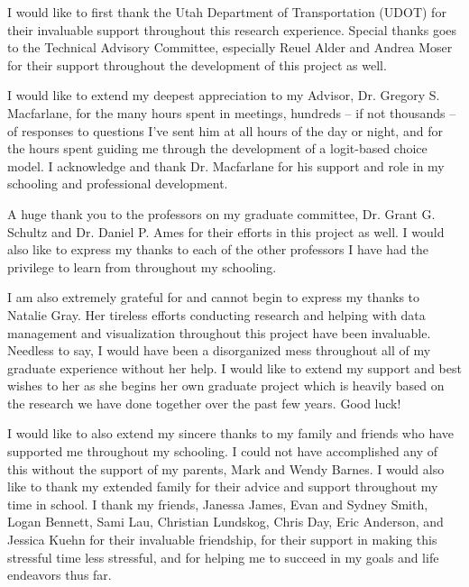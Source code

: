 \afterpage{\cleardoublepage}
%
 I would like to first thank the Utah Department of Transportation (UDOT) for
 their invaluable support throughout this research experience. Special thanks
 goes to the Technical Advisory Committee, especially Reuel Alder and Andrea
 Moser for their support throughout the development of this project as well.

 I would like to extend my deepest appreciation to my Advisor, Dr. Gregory
 S. Macfarlane, for the many hours spent in meetings, hundreds -- if not thousands
 -- of responses to questions I've sent him at all hours of the day or night, and
 for the hours spent guiding me through the development of a logit-based choice
 model. I acknowledge and thank Dr. Macfarlane for his support and role in my
 schooling and professional development.

A huge thank you to the professors on my graduate committee, Dr. Grant G.
Schultz and Dr. Daniel P. Ames for their efforts in this project as well. I
would also like to express my thanks to each of the other professors I have
had the privilege to learn from throughout my schooling.

 I am also extremely grateful for and cannot begin to express my thanks to
 Natalie Gray. Her tireless efforts conducting research and helping with
 data management and visualization throughout this project have been invaluable. Needless to say,
 I would have been a disorganized mess throughout all of my graduate experience
 without her help. I would like to extend my support and best wishes to her as
 she begins her own graduate project which is heavily based on the research we have done
 together over the past few years. Good luck!

I would like to also extend my sincere thanks to my family and friends who have
supported me throughout my schooling. I could not have accomplished any of this
without the support of my parents, Mark and Wendy Barnes. I would also like to
thank my extended family for their advice and support throughout my time in
school. I thank my friends, Janessa James, Evan and Sydney Smith, Logan Bennett,
Sami Lau, Christian Lundskog, Chris Day, Eric Anderson, and Jessica Kuehn for
their invaluable friendship, for their support in making this stressful time
less stressful, and for helping me to succeed in my goals and life endeavors thus far.
